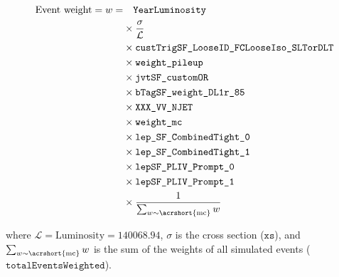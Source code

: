 \begin{align}
    \text{Event weight} = w =
     & \quad \texttt{YearLuminosity}                                       \nonumber \\
     & \times \frac{\sigma}{\mathcal{L}}                              \nonumber      \\
     & \times \texttt{custTrigSF\_LooseID\_FCLooseIso\_SLTorDLT} \nonumber           \\
     & \times \texttt{weight\_pileup}                            \nonumber           \\
     & \times \texttt{jvtSF\_customOR}                           \nonumber           \\
     & \times \texttt{bTagSF\_weight\_DL1r\_85}                  \nonumber           \\
     & \times \texttt{XXX\_VV\_NJET}                             \nonumber           \\
     & \times \texttt{weight\_mc}                                \nonumber           \\
     & \times \texttt{lep\_SF\_CombinedTight\_0}                   \nonumber         \\
     & \times \texttt{lep\_SF\_CombinedTight\_1}                   \nonumber         \\
     & \times \texttt{lepSF\_PLIV\_Prompt\_0}                      \nonumber         \\
     & \times \texttt{lepSF\_PLIV\_Prompt\_1}                      \nonumber         \\
     & \times \frac{1}{\sum_{w \sim \text{\acrshort{mc}}} w}
\end{align}

where $\mathcal{L} = \text{Luminosity} = 140068.94$, $\sigma$ is the cross section ($\texttt{xs}$), and $\sum_{w \sim
        \text{\acrshort{mc}}} w$ is the sum of the weights of all simulated events ($\texttt{totalEventsWeighted}$).






